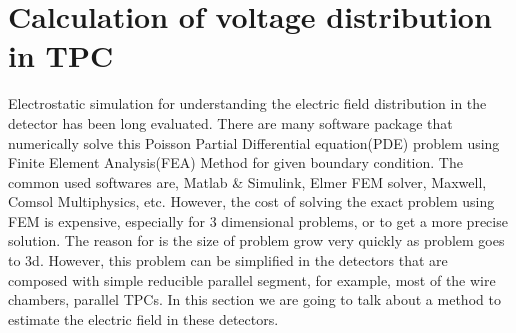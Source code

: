\chapter{Calculation of voltage distribution in TPC}
\label{chapter:wirefield}
Electrostatic simulation for understanding the electric field distribution in the detector has been long evaluated. There are many software package that numerically solve this Poisson Partial Differential equation(PDE) problem using Finite Element Analysis(FEA) Method for given boundary condition. The common used softwares are, Matlab \& Simulink, Elmer FEM solver, Maxwell, Comsol Multiphysics, etc. However, the cost of solving the exact problem using FEM is expensive, especially for 3 dimensional problems, or to get a more precise solution. The reason for is the size of problem grow very quickly as problem goes to 3d. 
However, this problem can be simplified in the detectors that are composed with simple reducible parallel segment, for example, most of the wire chambers, parallel TPCs. In this section we are going to talk about a method to estimate the electric field in these detectors.

